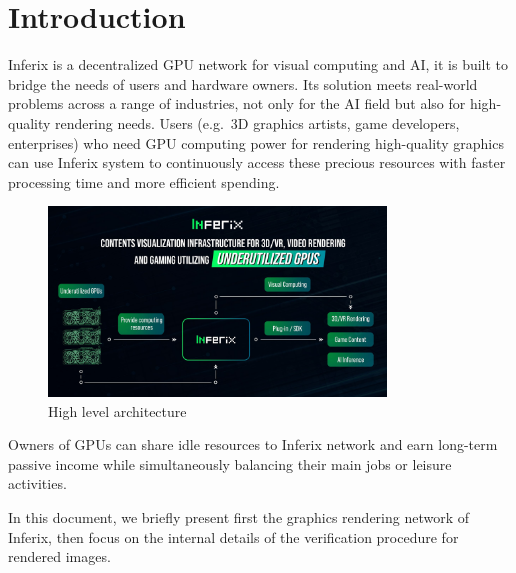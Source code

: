 \chapter{Introduction}
\label{ch:introduction}
Inferix is a decentralized GPU network for visual computing and AI, it is built to bridge the needs of users and hardware owners. Its solution meets real-world problems across a range of industries, not only for the AI field but also for high-quality rendering needs. Users (e.g.~3D graphics artists, game developers, enterprises) who need GPU computing power for rendering high-quality graphics can use Inferix system to continuously access these precious resources with faster processing time and more efficient spending.
\begin{figure}[h]
    \centering
    \includegraphics[width=0.8\textwidth]{inferix_high_level_architecture.jpg}
    \caption{High level architecture}
    \label{fig:inferix_rendering_network_high_level}
\end{figure}
Owners of GPUs can share idle resources to Inferix network and earn long-term passive income while simultaneously balancing their main jobs or leisure activities.

In this document, we briefly present first the graphics rendering network of Inferix, then focus on the internal details of the verification procedure for rendered images.




